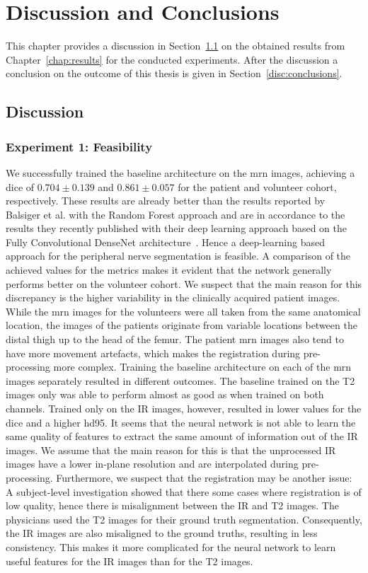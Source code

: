 \chapter{Discussion and Conclusions}
This chapter provides a discussion in Section~\ref{disc:discussion} on the obtained results from Chapter~\ref{chap:results} for the conducted experiments. After the discussion a conclusion on the outcome of this thesis is given in Section~\ref{disc:conclusions}.

\section{Discussion} \label{disc:discussion}
\subsection{Experiment 1: Feasibility}
We successfully trained the baseline architecture on the \gls{mrn} images, achieving a \acrlong{dice} of $0.704 \pm 0.139$ and $0.861 \pm 0.057$ for the patient and volunteer cohort, respectively. These results are already better than the results reported by Balsiger et al. \cite{Balsiger2016DevelopmentApproaches} with the Random Forest approach and are in accordance to the results they recently published \cite{BalsigerContext-awareNeurography} with their deep learning approach based on the Fully Convolutional DenseNet architecture~\cite{Jegou2017TheSegmentation}. Hence a deep-learning based approach for the peripheral nerve segmentation is feasible.
A comparison of the achieved values for the metrics makes it evident that the network generally performs better on the volunteer cohort. We suspect that the main reason for this discrepancy is the higher variability in the clinically acquired patient images. While the \gls{mrn} images for the volunteers were all taken from the same anatomical location, the images of the patients originate from variable locations between the distal thigh up to the head of the femur. The patient \gls{mrn} images also tend to have more movement artefacts, which makes the registration during pre-processing more complex.
Training the baseline architecture on each of the \gls{mrn} images separately resulted in different outcomes. The baseline trained on the T2 images only was able to perform almost as good as when trained on both channels. Trained only on the IR images, however, resulted in lower values for the \acrlong{dice} and a higher \acrlong{hd95}. It seems that the neural network is not able to learn the same quality of features to extract the same amount of information out of the IR images. We assume that the main reason for this is that the unprocessed IR images have a lower in-plane resolution and are interpolated during pre-processing.
Furthermore, we suspect that the registration may be another issue: A subject-level investigation showed that there some cases where registration is of low quality, hence there is misalignment between the IR and T2 images. The physicians used the T2 images for their ground truth segmentation. Consequently, the IR images are also misaligned to the ground truths, resulting in less consistency. This makes it more complicated for the neural network to learn useful features for the IR images than for the T2 images.

